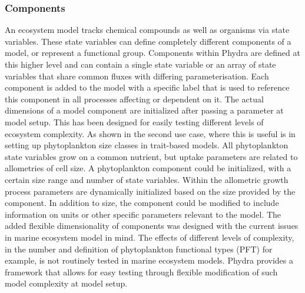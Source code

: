 \subsubsection{Components}

An ecosystem model tracks chemical compounds as well as organisms via state variables. These state variables can define completely different components of a model, or represent a functional group. Components within Phydra are defined at this higher level and can contain a single state variable or an array of state variables that share common fluxes with differing parameterisation. Each component is added to the model with a specific label that is used to reference this component in all processes affecting or dependent on it. The actual dimensions of a model component are initialized after passing a parameter at model setup. This has been designed for easily testing different levels of ecosystem complexity. As shown in the second use case, where this is useful is in setting up phytoplankton size classes in trait-based models. All phytoplankton state variables grow on a common nutrient, but uptake parameters are related to allometries of cell size. A phytoplankton component could be initialized, with a certain size range and number of state variables. Within the allometric growth process parameters are dynamically initialized based on the size provided by the component. 
In addition to size, the component could be modified to include information on units or other specific parameters relevant to the model. The added flexible dimensionality of components was designed with the current issues in marine ecosystem model in mind. The effects of different levels of complexity, in the number and definition of phytoplankton functional types (PFT) for example, is not routinely tested in marine ecosystem models. Phydra provides a framework that allows for easy testing through flexible modification of such model complexity at model setup.



